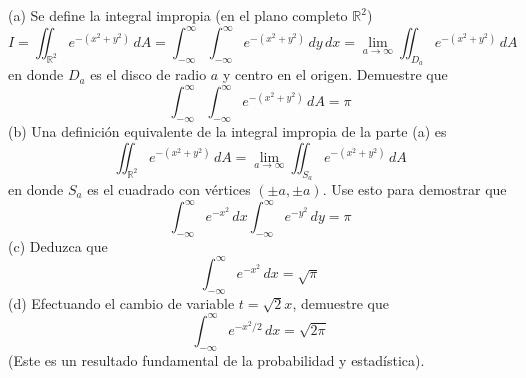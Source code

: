 \item (a) Se define la integral impropia (en el plano completo $\mathbb{R}^2$)
\[ I = \iint_{\mathbb{R}^2} e^{-(x^2+y^2)} \, dA = \int_{-\infty}^\infty \int_{-\infty}^\infty e^{-(x^2+y^2)} \, dy \, dx = \lim_{a \to \infty} \iint_{D_a} e^{-(x^2+y^2)} \, dA \]
en donde $D_a$ es el disco de radio $a$ y centro en el origen. Demuestre que
\[ \int_{-\infty}^\infty \int_{-\infty}^\infty e^{-(x^2+y^2)} \, dA = \pi \]
(b) Una definición equivalente de la integral impropia de la parte (a) es
\[ \iint_{\mathbb{R}^2} e^{-(x^2+y^2)} \, dA = \lim_{a \to \infty} \iint_{S_a} e^{-(x^2+y^2)} \, dA \]
en donde $S_a$ es el cuadrado con vértices $(\pm a, \pm a)$. Use esto para demostrar que
\[ \int_{-\infty}^\infty e^{-x^2} \, dx \int_{-\infty}^\infty e^{-y^2} \, dy = \pi \]
(c) Deduzca que
\[ \int_{-\infty}^\infty e^{-x^2} \, dx = \sqrt{\pi} \]
(d) Efectuando el cambio de variable $t = \sqrt{2}x$, demuestre que
\[ \int_{-\infty}^\infty e^{-x^2/2} \, dx = \sqrt{2\pi} \]
(Este es un resultado fundamental de la probabilidad y estadística).
